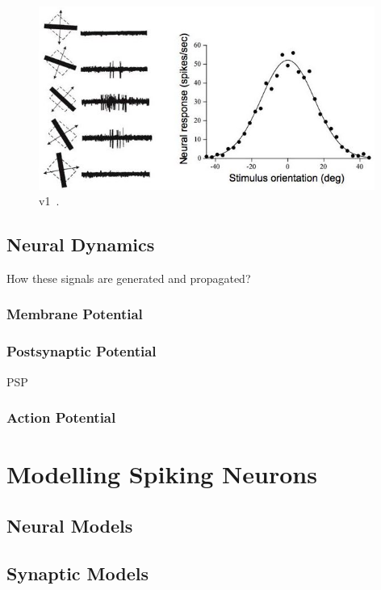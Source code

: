 \begin{figure}[bt]
	\centering
	\includegraphics[width=0.98\textwidth]{pics_snn/v1.jpg}
	\caption{v1~\cite{hubel1962receptive}.}
	\label{Fig:v1}
\end{figure}

\subsection{Neural Dynamics}
How these signals are generated and propagated?

\subsubsection{Membrane Potential}
\subsubsection{Postsynaptic Potential}
PSP
\subsubsection{Action Potential}

\section{Modelling Spiking Neurons}
\label{sec:spike}
\subsection{Neural Models}
\subsection{Synaptic Models}
